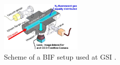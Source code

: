 \begin{figure}
  \begin{center}
		\includegraphics[width=0.35\textwidth]{02_BeamDiag/figures/fig000_FPM}
	\end{center}
	\caption[Scheme of a BIF setup used at GSI.]{Scheme of a BIF setup used at GSI \cite{ForckJUAS}.}
	\label{chap3:fig:FPM}
\end{figure}
